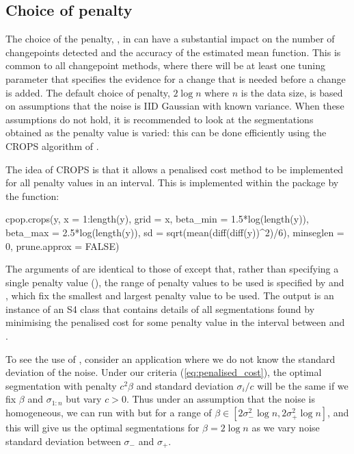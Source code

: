 \documentclass[article]{jss}
\begin{document}
\subsection{Choice of penalty}

The choice of the penalty, , in  can have a substantial impact on the number of changepoints detected and the accuracy of the estimated mean function. This is common to all changepoint methods, where there will be at least one tuning parameter that specifies the evidence for a change that is needed before a change is added. The default choice of penalty, $2\log n$ where $n$ is the data size, is based on assumptions that the noise is IID Gaussian with known variance. When these assumptions do not hold, it is recommended to look at the segmentations obtained as the penalty value is varied: this can be done efficiently using the CROPS algorithm of \cite{haynes2017computationally}. 

The idea of CROPS is that it allows a penalised cost method to be implemented for all penalty values in an interval. This is implemented within the  package by the function:
\begin{CodeInput}
cpop.crops(y, x = 1:length(y), grid = x, beta_min = 1.5*log(length(y)),
  beta_max = 2.5*log(length(y)), sd =  sqrt(mean(diff(diff(y))^2)/6), 
  minseglen = 0, prune.approx = FALSE)
\end{CodeInput}
The arguments of  are identical to those of  except that, rather than specifying a single penalty value (), the range of penalty values to be used is specified by  and , which fix the smallest and largest penalty value to be used. The output is an instance of an S4 class that contains details of all segmentations found by minimising the penalised cost for some penalty value in the interval between  and .

To see the use of , consider an application where we do not know the standard deviation of the noise. Under our criteria (\ref{eq:penalised_cost}), the optimal segmentation with penalty $c^2 \beta$ and standard deviation $\sigma_i/c$ will be the same if we fix $\beta$ and $\sigma_{1:n}$ but vary $c>0$. Thus under an assumption that the noise is homogeneous, we can run  with  but for a range of $\beta \in [2\sigma_{-}^2\log n,2\sigma_{+}^2\log n]$, and this will give us the optimal segmentations for $\beta=2 \log n$ as we vary noise standard deviation between $\sigma_{-}$ and $\sigma_{+}$.
\end{document}
